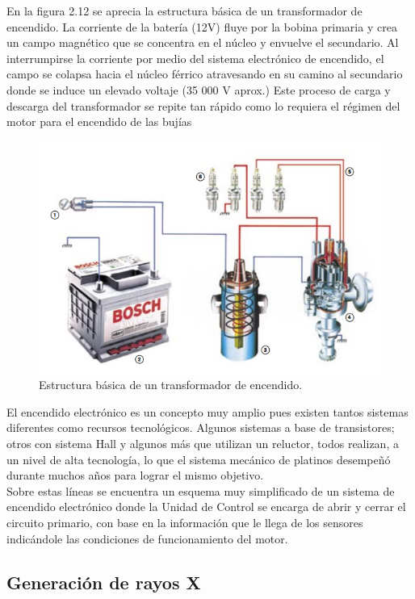 En la figura 2.12 se aprecia la estructura básica de un transformador
de encendido. La corriente de la batería (12V) fluye por la bobina
primaria y crea un campo magnético que se concentra en el
núcleo y envuelve el secundario. Al interrumpirse la corriente
por medio del sistema electrónico de encendido, el campo se colapsa
hacia el núcleo férrico atravesando en su camino al 
secundario donde se induce un elevado voltaje (35 000 V aprox.) Este
proceso de carga y descarga del transformador se repite tan rápido como
lo requiera el régimen del motor para el encendido de las bujías


\begin{figure}[H]
\centering
\includegraphics[width=12cm]{capitulo3/figs/trans3.png}
\caption{ Estructura básica de un transformador de encendido. \cite{ignicion}}
\end{figure}

El encendido electrónico es un concepto muy amplio pues existen
tantos sistemas diferentes como recursos tecnológicos. Algunos sistemas
a base de transistores; otros con sistema Hall y algunos más que utilizan
un reluctor, todos realizan, a un nivel de alta tecnología, lo que el sistema
mecánico de platinos desempeñó durante muchos años para lograr el
mismo objetivo.\\

Sobre estas líneas se encuentra un esquema muy simplificado de
un sistema de encendido electrónico donde la Unidad de Control se
encarga de abrir y cerrar el circuito primario, con base en la información
que le llega de los sensores indicándole las condiciones de
funcionamiento del motor. \cite{ignicion}

\subsection{Generación de rayos X}

